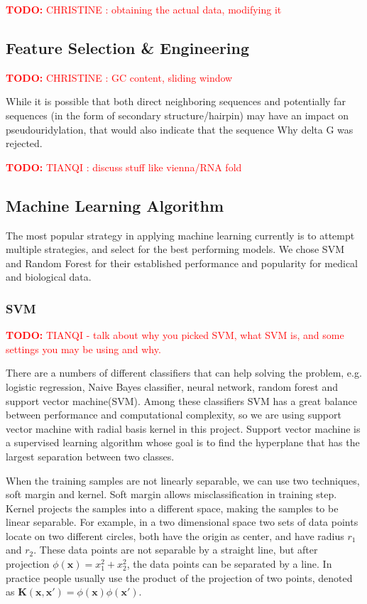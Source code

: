 \documentclass[paper=a4, fontsize=11pt]{scrartcl}
\numberwithin{equation}{section}    %
\numberwithin{figure}{section}      %
\numberwithin{table}{section}       %
\newcommand{\TODO}[1]{\textcolor{red}{\textbf{TODO: } #1}}
\numberwithin{equation}{section}    %
\numberwithin{figure}{section}      %
\numberwithin{table}{section}       %
\begin{document}
\TODO{CHRISTINE : obtaining the actual data, modifying it}

\subsection{Feature Selection \& Engineering}

\TODO{CHRISTINE :  GC content, sliding window}

While it is possible that both direct neighboring sequences and potentially far sequences (in the form of secondary structure/hairpin) may have an impact on pseudouridylation, that would also indicate that the sequence 
Why delta G was rejected. 

\TODO{TIANQI : discuss stuff like vienna/RNA fold}




\subsection{Machine Learning Algorithm}

The most popular strategy in applying machine learning currently is to attempt multiple strategies, and select for the best performing models. We chose SVM and Random Forest for their established performance and popularity for medical and biological data. 

\subsubsection{SVM}

\TODO{TIANQI - talk about why you picked SVM, what SVM is, and some settings you may be using and why.}

There are a numbers of different classifiers that can help solving the problem, e.g. logistic regression, Naive Bayes classifier, neural network, random forest and support vector machine(SVM). Among these classifiers SVM has a great balance between performance and computational complexity, so we are using support vector machine with radial basis kernel in this project. Support vector machine is a supervised learning algorithm whose goal is to find the hyperplane that has the largest separation between two classes. 

When the training samples are not linearly separable, we can use two techniques, soft margin and kernel. Soft margin allows misclassification in training step. Kernel projects the samples into a different space, making the samples to be linear separable. For example, in a two dimensional space two sets of data points locate on two different circles, both have the origin as center, and have radius $r_1$ and $r_2$. These data points are not separable by a straight line, but after projection $\phi(\boldsymbol{x})=x_1^2+x_2^2$, the data points can be separated by a line. In practice people usually use the product of the projection of two points, denoted as $\boldsymbol{K}(\boldsymbol{x},\boldsymbol{x'})=\phi(\boldsymbol{x})\phi(\boldsymbol{x'})$.
\end{document}

